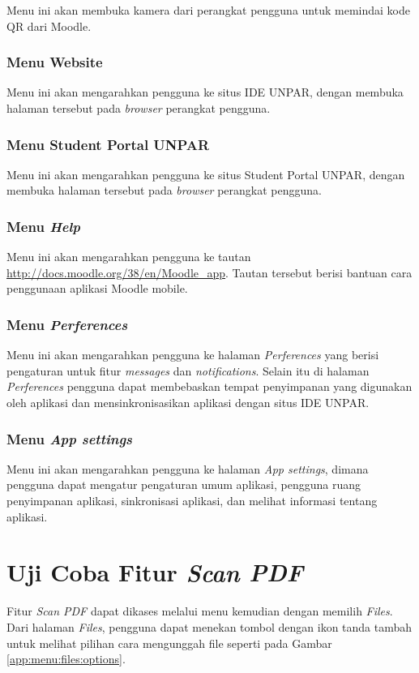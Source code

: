 Menu ini akan membuka kamera dari perangkat pengguna untuk memindai kode QR dari Moodle.

\subsubsection{Menu Website}

Menu ini akan mengarahkan pengguna ke situs IDE UNPAR, dengan membuka halaman tersebut pada \textit{browser} perangkat pengguna.

\subsubsection{Menu Student Portal UNPAR}
Menu ini akan mengarahkan pengguna ke situs Student Portal UNPAR, dengan membuka halaman tersebut pada \textit{browser} perangkat pengguna.

\subsubsection{Menu \textit{Help}}
Menu ini akan mengarahkan pengguna ke tautan \url{http://docs.moodle.org/38/en/Moodle\_app}. Tautan tersebut berisi bantuan cara penggunaan aplikasi Moodle mobile.

\subsubsection{Menu \textit{Perferences}}
Menu ini akan mengarahkan pengguna ke halaman \textit{Perferences} yang berisi pengaturan untuk fitur \textit{messages} dan \textit{notifications}. Selain itu di halaman \textit{Perferences} pengguna dapat membebaskan tempat penyimpanan yang digunakan oleh aplikasi dan mensinkronisasikan aplikasi dengan situs IDE UNPAR.

\subsubsection{Menu \textit{App settings}}
Menu ini akan mengarahkan pengguna ke halaman \textit{App settings}, dimana pengguna dapat mengatur pengaturan umum aplikasi, pengguna ruang penyimpanan aplikasi, sinkronisasi aplikasi, dan melihat informasi tentang aplikasi.

\section{Uji Coba Fitur \textit{Scan PDF}}

Fitur \textit{Scan PDF} dapat dikases melalui menu kemudian dengan memilih \textit{Files}. Dari halaman \textit{Files}, pengguna dapat menekan tombol dengan ikon tanda tambah untuk melihat pilihan cara mengunggah file seperti pada Gambar \ref{app:menu:files:options}. 

